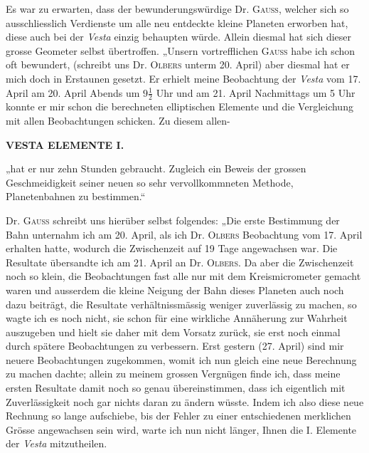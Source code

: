 \par\indent Es war zu erwarten, dass der bewunderungswürdige Dr. \textsc{Gauss}, welcher sich so ausschliesslich Verdienste um alle neu entdeckte kleine Planeten erworben hat, diese auch bei der \emph{Vesta} einzig behaupten würde. Allein diesmal hat sich dieser grosse Geometer selbst übertroffen. „Unsern vortrefflichen \textsc{Gauss} habe ich schon oft bewundert, (schreibt uns Dr. \textsc{Olbers} unterm 20. April) aber diesmal hat er mich doch in Erstaunen gesetzt. Er erhielt meine Beobachtung der \emph{Vesta} vom 17. April am 20. April Abends um $9\tfrac{1}{2}$ Uhr und am 21. April Nachmittags um 5 Uhr konnte er mir schon die berechneten elliptischen Elemente und die Vergleichung mit allen Beobachtungen schicken. Zu diesem allen-\par
{}
\clearpage
\thispagestyle{empty}
\noindent{}%
%
\parbox[t]{\dimexpr\linewidth-24mm\relax}{\centering\footnotesize\bfseries VESTA ELEMENTE I.\par}%
\makebox[12mm][r]{}\par\nobreak\medskip
\noindent „hat er nur zehn Stunden gebraucht. Zugleich ein Beweis der grossen Geschmeidigkeit seiner neuen so sehr vervollkommneten Methode, Planetenbahnen zu bestimmen.“

\par\indent Dr. \textsc{Gauss} schreibt uns hierüber selbst folgendes: „Die erste Bestimmung der Bahn unternahm ich am 20. April, als ich Dr. \textsc{Olbers} Beobachtung vom 17. April erhalten hatte, wodurch die Zwischenzeit auf 19 Tage angewachsen war. Die Resultate übersandte ich am 21. April an Dr. \textsc{Olbers}. Da aber die Zwischenzeit noch so klein, die Beobachtungen fast alle nur mit dem Kreismicrometer gemacht waren und ausserdem die kleine Neigung der Bahn dieses Planeten auch noch dazu beiträgt, die Resultate verhältnissmässig weniger zuverlässig zu machen, so wagte ich es noch nicht, sie schon für eine wirkliche Annäherung zur Wahrheit auszugeben und hielt sie daher mit dem Vorsatz zurück, sie erst noch einmal durch spätere Beobachtungen zu verbessern. Erst gestern (27. April) sind mir neuere Beobachtungen zugekommen, womit ich nun gleich eine neue Berechnung zu machen dachte; allein zu meinem grossen Vergnügen finde ich, dass meine ersten Resultate damit noch so genau übereinstimmen, dass ich eigentlich mit Zuverlässigkeit noch gar nichts daran zu ändern wüsste. Indem ich also diese neue Rechnung so lange aufschiebe, bis der Fehler zu einer entschiedenen merklichen Grösse angewachsen sein wird, warte ich nun nicht länger, Ihnen die I. Elemente der \emph{Vesta} mitzutheilen.

